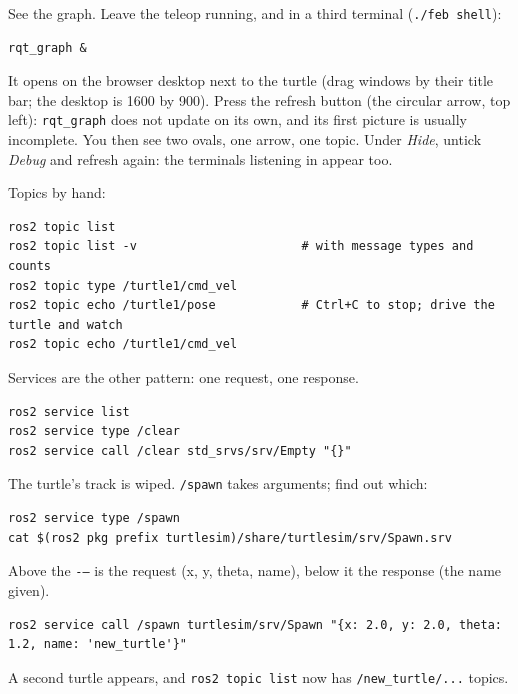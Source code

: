 \documentclass[11pt,a4paper]{article}
\begin{document}
See the graph. Leave the teleop running, and in a third terminal (\texttt{./feb shell}):

\begin{lstlisting}
rqt_graph &
\end{lstlisting}

It opens on the browser desktop next to the turtle (drag windows by their title bar; the
desktop is 1600 by 900). Press the refresh button (the circular arrow, top left):
\texttt{rqt\_graph} does not update on its own, and its first picture is usually incomplete.
You then see two ovals, one arrow, one topic. Under \emph{Hide}, untick \emph{Debug} and
refresh again: the terminals listening in appear too.

Topics by hand:

\begin{lstlisting}
ros2 topic list
ros2 topic list -v                       # with message types and counts
ros2 topic type /turtle1/cmd_vel
ros2 topic echo /turtle1/pose            # Ctrl+C to stop; drive the turtle and watch
ros2 topic echo /turtle1/cmd_vel
\end{lstlisting}

Services are the other pattern: one request, one response.

\begin{lstlisting}
ros2 service list
ros2 service type /clear
ros2 service call /clear std_srvs/srv/Empty "{}"
\end{lstlisting}

The turtle's track is wiped. \texttt{/spawn} takes arguments; find out which:

\begin{lstlisting}
ros2 service type /spawn
cat $(ros2 pkg prefix turtlesim)/share/turtlesim/srv/Spawn.srv
\end{lstlisting}

Above the \texttt{-{}--} is the request (x, y, theta, name), below it the response (the name
given).

\begin{lstlisting}
ros2 service call /spawn turtlesim/srv/Spawn "{x: 2.0, y: 2.0, theta: 1.2, name: 'new_turtle'}"
\end{lstlisting}

A second turtle appears, and \texttt{ros2 topic list} now has \texttt{/new\_turtle/...} topics.

\end{document}
